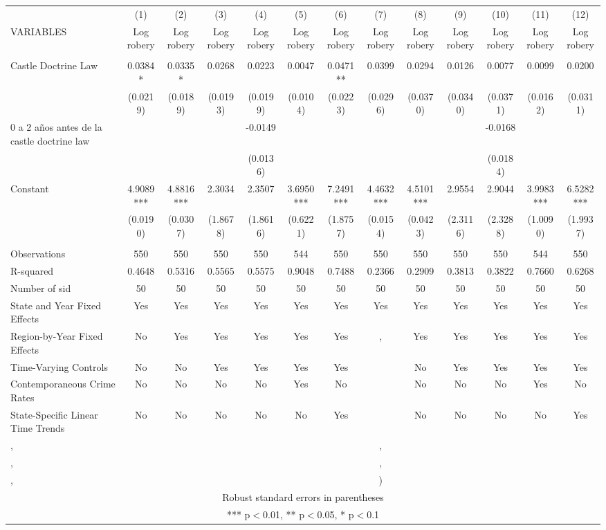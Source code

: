 \documentclass[]{article}
\begin{document}
\begin{tabular}{lcccccccccccc} \hline
 & (1) & (2) & (3) & (4) & (5) & (6) & (7) & (8) & (9) & (10) & (11) & (12) \\
VARIABLES & Log robery & Log robery & Log robery & Log robery & Log robery & Log robery & Log robery & Log robery & Log robery & Log robery & Log robery & Log robery \\ \hline
 &  &  &  &  &  &  &  &  &  &  &  &  \\
Castle Doctrine Law & 0.0384* & 0.0335* & 0.0268 & 0.0223 & 0.0047 & 0.0471** & 0.0399 & 0.0294 & 0.0126 & 0.0077 & 0.0099 & 0.0200 \\
 & (0.0219) & (0.0189) & (0.0193) & (0.0199) & (0.0104) & (0.0223) & (0.0296) & (0.0370) & (0.0340) & (0.0371) & (0.0162) & (0.0311) \\
0 a 2 años antes de la castle doctrine law &  &  &  & -0.0149 &  &  &  &  &  & -0.0168 &  &  \\
 &  &  &  & (0.0136) &  &  &  &  &  & (0.0184) &  &  \\
Constant & 4.9089*** & 4.8816*** & 2.3034 & 2.3507 & 3.6950*** & 7.2491*** & 4.4632*** & 4.5101*** & 2.9554 & 2.9044 & 3.9983*** & 6.5282*** \\
 & (0.0190) & (0.0307) & (1.8678) & (1.8616) & (0.6221) & (1.8757) & (0.0154) & (0.0423) & (2.3116) & (2.3288) & (1.0090) & (1.9937) \\
 &  &  &  &  &  &  &  &  &  &  &  &  \\
Observations & 550 & 550 & 550 & 550 & 544 & 550 & 550 & 550 & 550 & 550 & 544 & 550 \\
R-squared & 0.4648 & 0.5316 & 0.5565 & 0.5575 & 0.9048 & 0.7488 & 0.2366 & 0.2909 & 0.3813 & 0.3822 & 0.7660 & 0.6268 \\
Number of sid & 50 & 50 & 50 & 50 & 50 & 50 & 50 & 50 & 50 & 50 & 50 & 50 \\
State and Year Fixed Effects & Yes & Yes & Yes & Yes & Yes & Yes & Yes & Yes & Yes & Yes & Yes & Yes \\
Region-by-Year Fixed Effects & No & Yes & Yes & Yes & Yes & Yes & , & Yes & Yes & Yes & Yes & Yes \\
Time-Varying Controls & No & No & Yes & Yes & Yes & Yes &  & No & Yes & Yes & Yes & Yes \\
Contemporaneous Crime Rates & No & No & No & No & Yes & No &  & No & No & No & Yes & No \\
State-Specific Linear Time Trends & No & No & No & No & No & Yes &  & No & No & No & No & Yes \\
, &  &  &  &  &  &  & , &  &  &  &  &  \\
, &  &  &  &  &  &  & , &  &  &  &  &  \\
 , &  &  &  &  &  &  & ) &  &  &  &  &  \\ \hline
\multicolumn{13}{c}{ Robust standard errors in parentheses} \\
\multicolumn{13}{c}{ *** p$<$0.01, ** p$<$0.05, * p$<$0.1} \\
\end{tabular}
\end{document}
